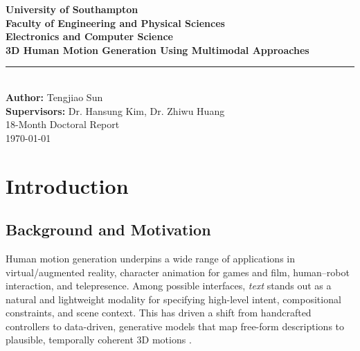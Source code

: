 \documentclass[a4paper,12pt]{article}
\newcommand{\Title}{3D Human Motion Generation Using Multimodal Approaches}
\newcommand{\AuthorName}{Tengjiao Sun}
\newcommand{\Supervisors}{Dr. Hansung Kim, Dr. Zhiwu Huang}
\newcommand{\Degree}{18-Month Doctoral Report}
\newcommand{\Affil}{University of Southampton\\Faculty of Engineering and Physical Sciences\\Electronics and Computer Science}
\newcommand{\DateSubmitted}{\today} %
\begin{document}
\onecolumn


\begin{titlepage}
    \centering
    \vspace*{2cm}
    {\LARGE \textbf{\Affil}}\\[1.2cm]
    {\Huge \textbf{\Title}}\\[0.8cm]
    \rule{\textwidth}{0.5pt}\\[0.4cm]
    {\large \textbf{Author:} \AuthorName}\\[0.2cm]
    {\large \textbf{Supervisors:} \Supervisors}\\[1.4cm]
    {\large \Degree}\\[0.2cm]
    {\large \DateSubmitted}\\[1.2cm]
\end{titlepage}

\begin{abstract}
\end{abstract}

\tableofcontents
\newpage

\section{Introduction}
\subsection{Background and Motivation}

Human motion generation underpins a wide range of applications in virtual/augmented reality, character animation for games and film, human–robot interaction, and telepresence. Among possible interfaces, \emph{text} stands out as a natural and lightweight modality for specifying high-level intent, compositional constraints, and scene context. This has driven a shift from handcrafted controllers to data-driven, generative models that map free-form descriptions to plausible, temporally coherent 3D motions \cite{ahuja2019language2pose,petrovich2022temos,kim2023flame,tevet2022human}.
\end{document}
